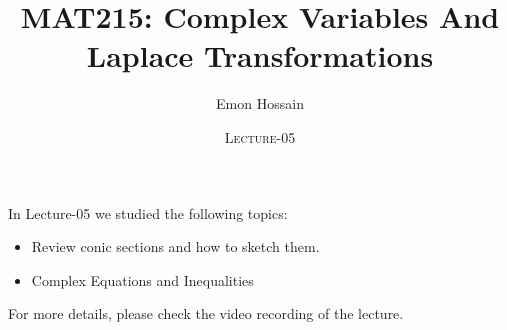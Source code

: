 \documentclass[11pt]{beamer}
\author[] %
{Emon Hossain\inst{1}}
\institute[University of Dhaka] %
{
  \inst{1}%
  Lecturer\\MNS department\\Brac University
}
\date[] %
{\textsc{Lecture-05}}
\title[]{MAT215: Complex Variables And Laplace Transformations}
\theoremstyle{plain}
\begin{document}
\begin{frame}
\titlepage
\end{frame}

\begin{frame}
    In Lecture-05 we studied the following topics: 
    \begin{itemize}
        \item Review conic sections and how to sketch them. 
        \item Complex Equations and Inequalities
    \end{itemize}
  For more details, please check the video recording of the lecture.  
\end{frame}
\end{document}
